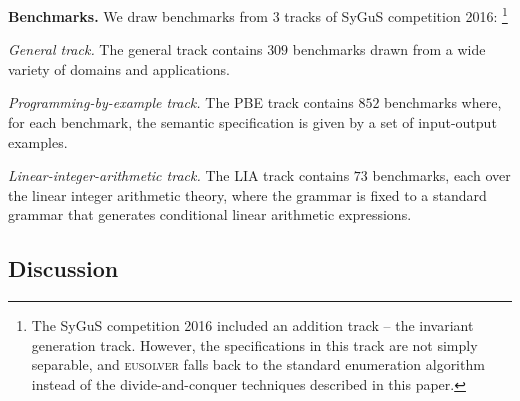 \documentclass{llncs}
\newcommand{\sygus}{{\sffamily\fontsize{8.5}{10}\selectfont
    SyGuS}\xspace}
\newcommand{\dcsolve}{{\sffamily\fontsize{8.5}{10}\selectfont
    DCSolve}\xspace}
\renewcommand{\paragraph}[1]{\par\noindent\textbf{#1.}}
\newcommand{\eusolver}{\textsc{eusolver}\xspace}
\begin{document}
\paragraph{Benchmarks}
We draw benchmarks from $3$ tracks of \sygus
competition 2016:
\footnote{The \sygus competition 2016 included an addition track -- the
invariant generation track.
However, the specifications in this track are not simply separable, and
\eusolver falls back to the standard enumeration algorithm instead of
the divide-and-conquer techniques described in this paper.
}\\
\begin{inparaenum}[(a)]
\item {\em General track.} The general track contains $309$ benchmarks
  drawn from a wide variety of domains and applications.\\
\item {\em Programming-by-example track.} The PBE track contains $852$
  benchmarks where, for each benchmark, the semantic specification is
  given by a set of input-output examples.\\
\item {\em Linear-integer-arithmetic track.} The LIA track contains $73$
  benchmarks, each over the linear integer arithmetic theory, where the
  grammar is fixed to a standard grammar that generates conditional
  linear arithmetic expressions.
\end{inparaenum}


\vspace*{-3mm}
\subsection{Discussion}
\end{document}
